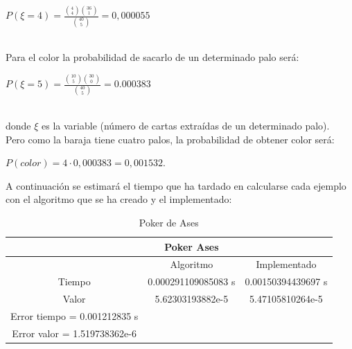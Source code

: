 \documentclass[spanish,a4paper,12pt]{report}
\begin{document}
\centerline{$P(\xi=4)=\frac {\binom {4} {4} \binom {36} {1}} { \binom {40} {5} }=0,000055$}
\ \\



Para el color la probabilidad de sacarlo de un determinado palo será:
\ \\

\centerline{$P(\xi=5)=\frac {\binom {10} {5} \binom {30} {0}} { \binom {40} {5} } = 0.000383$} 

\ \\

donde $\xi$ es la variable (número de cartas extraídas de un determinado palo).\\
Pero como la baraja tiene cuatro palos, la probabilidad de obtener color será: \\

\centerline{$P(color)=4\cdot 0,000383=0,001532.$}

A continuación se estimará el tiempo que ha tardado en calcularse cada ejemplo con el algoritmo que se ha creado y el implementado:\\

\begin{table}[!ht]
\centering
\begin{tabular}{ccc}
& Poker Ases &\\
\hline
 & Algoritmo & Implementado\\
Tiempo & 0.000291109085083 s & 0.00150394439697 s\\
Valor & 5.62303193882e-5  & 5.47105810264e-5 \\
\hline
Error tiempo = 0.001212835 s\\
Error valor = 1.519738362e-6
\end{tabular}\\
\caption{Poker de Ases}
\end{table}
\end{document}
